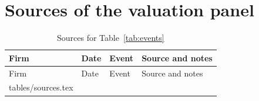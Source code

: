 \documentclass[12pt]{article}
\makeatletter
\newcommand{\tabinput}[1]{\@@input #1 }
\makeatother
\begin{document}
\appendix
\section{Sources of the valuation panel}

\begingroup
\footnotesize
\setlength{\tabcolsep}{4pt}
\begin{longtable}{lll>{\raggedright\arraybackslash}p{}}
\caption{Sources for Table~\ref{tab:events}}\label{tab:sources}\\
\toprule
Firm & Date & Event & Source and notes \\
\midrule
\endfirsthead
\toprule
Firm & Date & Event & Source and notes \\
\midrule
\endhead
\tabinput{tables/sources.tex}
\bottomrule
\end{longtable}
\endgroup
\end{document}
